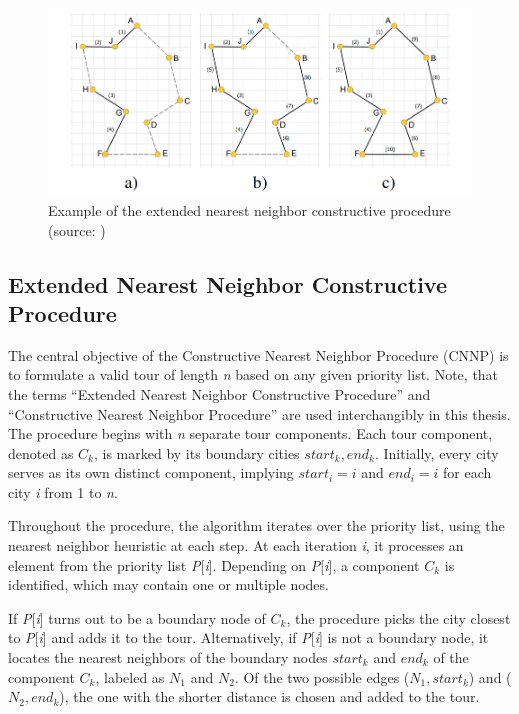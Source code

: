 \documentclass[twoside]{ctuthesis}
\theoremstyle{plain}
\theoremstyle{definition}
\theoremstyle{note}
\begin{document}
\begin{figure}
	\includegraphics[width=\linewidth]{tspexample.png}
	\caption{Example of the extended nearest neighbor constructive
		procedure (source: \cite{kubalik2014novel})}
	\label{fig:tsp}
\end{figure}


\subsection{Extended Nearest Neighbor Constructive Procedure}
\label{sec:CNNP}
The central objective of the Constructive Nearest Neighbor Procedure (CNNP) is to formulate a valid tour of length \emph{n} based on any given priority list. Note, that the terms ``Extended Nearest Neighbor Constructive Procedure'' and ``Constructive Nearest Neighbor Procedure'' are used interchangibly in this thesis. The procedure begins with \emph{n} separate tour components. Each tour component, denoted as \emph{$ C_k $}, is marked by its boundary cities \emph{$ start_k, end_k $}. Initially, every city serves as its own distinct component, implying \emph{$ start_i = i $} and \emph{$ end_i = i $} for each city \emph{i} from 1 to \emph{n}.

Throughout the procedure, the algorithm iterates over the priority list, using the nearest neighbor heuristic at each step. At each iteration \emph{i}, it processes an element from the priority list \emph{P}[\emph{i}]. Depending on \emph{P}[\emph{i}], a component \emph{$ C_k $} is identified, which may contain one or multiple nodes.

If \emph{P}[\emph{i}] turns out to be a boundary node of \emph{$ C_k $}, the procedure picks the city closest to \emph{P}[\emph{i}] and adds it to the tour. Alternatively, if \emph{P}[\emph{i}] is not a boundary node, it locates the nearest neighbors of the boundary nodes \emph{$ start_k $} and \emph{$ end_k $} of the component \emph{$ C_k $}, labeled as \emph{$ N_1 $} and \emph{$ N_2 $}. Of the two possible edges (\emph{$ N_1, start_k $}) and (\emph{$ N_2, end_k $}), the one with the shorter distance is chosen and added to the tour.
\end{document}
